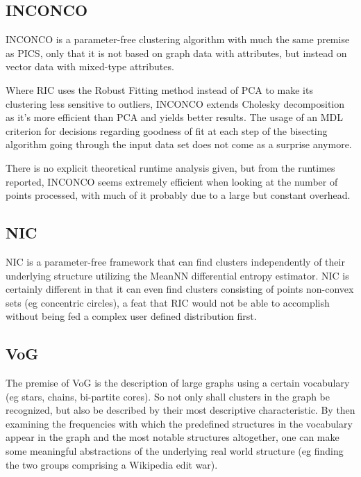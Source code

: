 \documentclass[conference]{IEEEtran}
\begin{document}
\subsection{INCONCO}
INCONCO is a parameter-free clustering algorithm with much the same premise as PICS, only that it is not based on graph data with attributes, but instead on vector data with mixed-type attributes.

Where RIC uses the Robust Fitting method instead of PCA to make its clustering less sensitive to outliers, INCONCO extends Cholesky decomposition\cite{Golub1996-ak} as it's more efficient than PCA and yields better results. The usage of an MDL criterion for decisions regarding goodness of fit at each step of the bisecting algorithm going through the input data set does not come as a surprise anymore.

There is no explicit theoretical runtime analysis given, but from the runtimes reported, INCONCO seems extremely efficient when looking at the number of points processed, with much of it probably due to a large but constant overhead.

\subsection{NIC}
NIC is a parameter-free framework that can find clusters independently of their underlying structure utilizing the MeanNN differential entropy estimator. NIC is certainly different in that it can even find clusters consisting of points non-convex sets (eg concentric circles), a feat that RIC would not be able to accomplish without being fed a complex user defined distribution first.

\subsection{VoG}
The premise of VoG is the description of large graphs using a certain vocabulary (eg stars, chains, bi-partite cores). So not only shall clusters in the graph be recognized, but also be described by their most descriptive characteristic. By then examining the frequencies with which the predefined structures in the vocabulary appear in the graph and the most notable structures altogether, one can make some meaningful abstractions of the underlying real world structure (eg finding the two groups comprising a Wikipedia edit war). 
\end{document}
